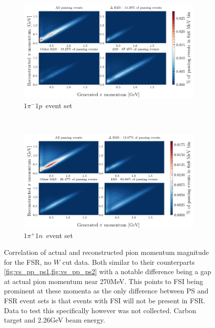 \documentclass[a4paper,12pt]{article}
\newcommand{\md}{$1\pi^-1p$}
\newcommand{\pd}{$1\pi^+1n$}
\begin{document}
\begin{appendices}
    \begin{figure}[H]
        \centering
        \begin{subfigure}{\textwidth}
            \centering
            \includegraphics{figures/python/vs_pp_C_m_fsr.pdf}
            \caption{\md\ event set}
        \end{subfigure}
        \\
        \begin{subfigure}{\textwidth}
            \centering
            \includegraphics{figures/python/vs_pp_C_p_fsr.pdf}
            \caption{\pd\ event set}
        \end{subfigure}
        \caption{
            Correlation of actual and reconstructed pion momentum magnitude for the FSR, no $W$ cut data.
            Both similar to their counterparts \cref{fig:vs_pp_ps1,fig:vs_pp_ps2} with a notable difference being a gap at actual pion momentum near 270\si{MeV}.
            This points to FSI being prominent at these momenta as the only difference between PS and FSR event sets is that events with FSI will not be present in FSR.
            Data to test this specifically however was not collected.
            Carbon target and 2.26\si{GeV} beam energy.
        }\label{fig:vs_pp_fsr}
    \end{figure}


\end{appendices}
\end{document}
